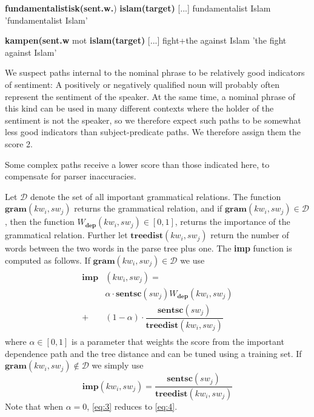 \documentclass[11pt]{article}
\begin{document}
\begin{examples}
\item\label{adjatr}
\gll [...] \textbf{fundamentalistisk(sent.w.}) \textbf{islam(target)} [...]
{} fundamentalist Islam {}
\glt 'fundamentalist Islam'
\glend

\item\label{substatr}
\gll [...] \textbf{kampen(sent.w} mot \textbf{islam(target)} [...]
{} fight+the against Islam {}
\glt 'the fight against Islam'
\glend

\end{examples}

We suspect paths internal to the nominal phrase to be relatively good indicators of sentiment: A positively or negatively qualified noun will probably often represent the sentiment of the speaker. At the same time, a nominal phrase of this kind can be used in many different contexts where the holder of the sentiment is not the speaker, so we therefore expect such paths to be somewhat less good indicators than subject-predicate paths. We therefore assign them the score 2.

Some complex paths receive a lower score than those indicated here, to compensate for parser inaccuracies.


Let $\mathcal{D}$ denote the set of all important grammatical relations. The function $\mathbf{gram}(kw_i, sw_{j})$ returns the grammatical relation, and if $\mathbf{gram}(kw_i, sw_{j}) \in \mathcal{D}$, then the function $W_{\mathbf{dep}}(kw_i, sw_{j}) \in [0,1]$, returns the importance of the grammatical relation. Further let $\mathbf{treedist}(kw_i, sw_{j})$ return the number of words between the two words in the parse tree plus one. The \textbf{imp} function is computed as follows. If $\mathbf{gram}(kw_i, sw_{j}) \in \mathcal{D}$ we use
\begin{align}
  \begin{split}
    \label{eq:3}
  \mathbf{imp}&(kw_i, sw_{j}) = \\
  &\alpha \cdot \mathbf{sentsc}(sw_{j}) W_{\mathbf{dep}}(kw_i, sw_{j}) \\
  +&(1 - \alpha) \cdot \dfrac{\mathbf{sentsc}(sw_{j})}{\mathbf{treedist}(kw_i, sw_{j})}    
  \end{split}
\end{align}
where $\alpha \in [0,1]$ is a parameter that weights the score from the important dependence path and the tree distance and can be tuned using a training set. If $\mathbf{gram}(kw_i, sw_{j}) \not\in \mathcal{D}$ we simply use 
\begin{equation}
  \label{eq:4}
  \mathbf{imp}(kw_i, sw_{j}) = \dfrac{\mathbf{sentsc}(sw_{j})}{\mathbf{treedist}(kw_i, sw_{j})}    
\end{equation}
Note that when $\alpha = 0$, \eqref{eq:3} reduces to \eqref{eq:4}.
\end{document}
